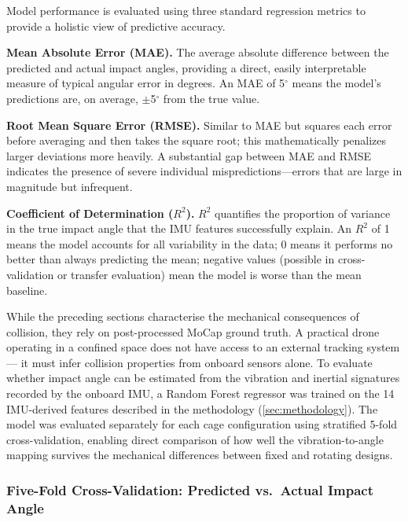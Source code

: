 Model performance is evaluated using three standard regression metrics to provide a holistic view of predictive accuracy.


\begin{tcolorbox}[breakable, colback=gray!8, colframe=black!30, arc=0pt,
    boxsep=10pt, left=4pt, right=4pt, top=4pt, bottom=4pt,
    before skip=6pt, after skip=6pt]
\textbf{Mean Absolute Error (MAE).}
The average absolute difference between the predicted and actual impact angles, providing a direct, easily interpretable measure of typical angular error in degrees. An MAE of 5$^\circ$ means the model's predictions are, on average, $\pm$5$^\circ$ from the true value.

\textbf{Root Mean Square Error (RMSE).}
Similar to MAE but squares each error before averaging and then takes the square root; this mathematically penalizes larger deviations more heavily. A substantial gap between MAE and RMSE indicates the presence of severe individual mispredictions---errors that are large in magnitude but infrequent.

\textbf{Coefficient of Determination ($R^2$).}
$R^2$ quantifies the proportion of variance in the true impact angle that the IMU features successfully explain. An $R^2$ of 1 means the model accounts for all variability in the data; 0 means it performs no better than always predicting the mean; negative values (possible in cross-validation or transfer evaluation) mean the model is worse than the mean baseline.
\end{tcolorbox}

While the preceding sections characterise the mechanical consequences of collision, they rely on post-processed MoCap ground truth. A practical drone operating in a confined space does not have access to an external tracking system --- it must infer collision properties from onboard sensors alone. To evaluate whether impact angle can be estimated from the vibration and inertial signatures recorded by the onboard IMU, a Random Forest regressor was trained on the 14 IMU-derived features described in the methodology (\autoref{sec:methodology}). The model was evaluated separately for each cage configuration using stratified 5-fold cross-validation, enabling direct comparison of how well the vibration-to-angle mapping survives the mechanical differences between fixed and rotating designs.

\subsubsection{Five-Fold Cross-Validation: Predicted vs.\ Actual Impact Angle}

